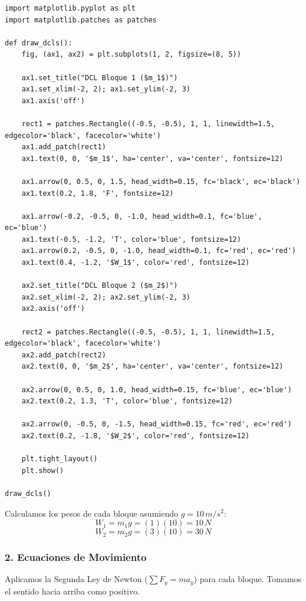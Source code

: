 \documentclass[12pt, a4paper]{article}
\begin{document}
\begin{lstlisting}
import matplotlib.pyplot as plt
import matplotlib.patches as patches

def draw_dcls():
    fig, (ax1, ax2) = plt.subplots(1, 2, figsize=(8, 5))
    
    ax1.set_title("DCL Bloque 1 ($m_1$)")
    ax1.set_xlim(-2, 2); ax1.set_ylim(-2, 3)
    ax1.axis('off')
    
    rect1 = patches.Rectangle((-0.5, -0.5), 1, 1, linewidth=1.5, edgecolor='black', facecolor='white')
    ax1.add_patch(rect1)
    ax1.text(0, 0, '$m_1$', ha='center', va='center', fontsize=12)
    
    ax1.arrow(0, 0.5, 0, 1.5, head_width=0.15, fc='black', ec='black')
    ax1.text(0.2, 1.8, 'F', fontsize=12)
    
    ax1.arrow(-0.2, -0.5, 0, -1.0, head_width=0.1, fc='blue', ec='blue')
    ax1.text(-0.5, -1.2, 'T', color='blue', fontsize=12)
    ax1.arrow(0.2, -0.5, 0, -1.0, head_width=0.1, fc='red', ec='red')
    ax1.text(0.4, -1.2, '$W_1$', color='red', fontsize=12)
    
    ax2.set_title("DCL Bloque 2 ($m_2$)")
    ax2.set_xlim(-2, 2); ax2.set_ylim(-2, 3)
    ax2.axis('off')
    
    rect2 = patches.Rectangle((-0.5, -0.5), 1, 1, linewidth=1.5, edgecolor='black', facecolor='white')
    ax2.add_patch(rect2)
    ax2.text(0, 0, '$m_2$', ha='center', va='center', fontsize=12)
    
    ax2.arrow(0, 0.5, 0, 1.0, head_width=0.15, fc='blue', ec='blue')
    ax2.text(0.2, 1.3, 'T', color='blue', fontsize=12)
    
    ax2.arrow(0, -0.5, 0, -1.5, head_width=0.15, fc='red', ec='red')
    ax2.text(0.2, -1.8, '$W_2$', color='red', fontsize=12)
    
    plt.tight_layout()
    plt.show()

draw_dcls()
\end{lstlisting}

Calculamos los pesos de cada bloque asumiendo $g = 10 \, \si{m/s^2}$:
$$ W_1 = m_1 g = (1)(10) = 10 \, \si{N} $$
$$ W_2 = m_2 g = (3)(10) = 30 \, \si{N} $$

\subsubsection*{2. Ecuaciones de Movimiento}
Aplicamos la Segunda Ley de Newton ($\sum F_y = m a_y$) para cada bloque. Tomamos el sentido hacia arriba como positivo.
\end{document}

